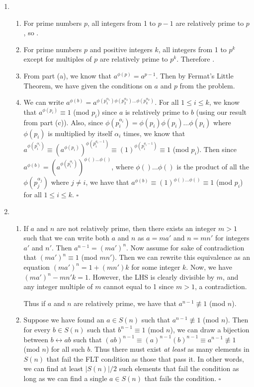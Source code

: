 \begin{enumerate}
    \item \begin{enumerate}
        \item For prime numbers $p$, all integers from 1 to $p-1$ are relatively prime to $p$, so .
        \item For prime numbers $p$ and positive integers $k$, all integers from 1 to $p^k$ except for multiples of $p$ are relatively prime to $p^k$. Therefore .
        \item From part (a), we know that $a^{\phi(p)}=a^{p-1}$. Then by Fermat's Little Theorem, we have  given the conditions on $a$ and $p$ from the problem.
        \item We can write $a^{\phi(b)} = a^{\phi(p_1^{\alpha_1})\phi(p_2^{\alpha_2})\ldots\phi(p_k^{\alpha_k})}$. For all $1\leq i\leq k$, we know that $a^{\phi(p_i)}\equiv 1$ (mod $p_i$) since $a$ is relatively prime to $b$ (using our result from part (c)). Also, since $\phi(p_i^{\alpha_i})=\phi(p_i)\phi(p_i)\ldots\phi(p_i)$ where $\phi(p_i)$ is multiplied by itself $\alpha_i$ times, we know that $a^{\phi(p_i^{\alpha_i})}\equiv (a^{\phi(p_i)})^{\phi(p_i^{a_i-1})} \equiv (1)^{\phi(p_i^{a_i-1})} \equiv 1$ (mod $p_i$). Then since $a^{\phi(b)} = (a^{\phi(p_i^{\alpha_i})})^{\phi()\ldots\phi()}$, where $\phi()\ldots\phi()$ is the product of all the $\phi(p_j^{\alpha_j})$ where $j\neq i$, we have that $a^{\phi(b)} \equiv (1)^{\phi()\ldots\phi()} \equiv 1$ (mod $p_i$) for all $1\leq i\leq k$. $\square$
    \end{enumerate}
    
    \item \begin{enumerate}
        \item If $a$ and $n$ are not relatively prime, then there exists an integer $m>1$ such that we can write both $a$ and $n$ as $a=ma'$ and $n=mn'$ for integers $a'$ and $n'$. Then $a^{n-1}=(ma')^n$. Now assume for sake of contradiction that $(ma')^n\equiv 1$ (mod $mn'$). Then we can rewrite this equivalence as an equation $(ma')^n = 1 + (mn')k$ for some integer $k$. Now, we have $(ma')^n-mn'k = 1$. However, the LHS is clearly divisible by $m$, and any integer multiple of $m$ cannot equal to 1 since $m>1$, a contradiction.
        
        Thus if $a$ and $n$ are relatively prime, we have that $a^{n-1}\not\equiv1$ (mod $n$).
        
        \item Suppose we have found an $a\in S(n)$ such that $a^{n-1}\not\equiv 1$ (mod $n$). Then for every $b\in S(n)$ such that $b^{n-1}\equiv 1$ (mod $n$), we can draw a bijection between $b\longleftrightarrow ab$ such that $(ab)^{n-1}\equiv (a)^{n-1}(b)^{n-1}\equiv a^{n-1}\not\equiv 1$ (mod $n$) for all such $b$. Thus there must exist \textit{at least} as many elements in $S(n)$ that fail the FLT condition as those that pass it. In other words, we can find at least $|S(n)|/2$ such elements that fail the condition as long as we can find a single $a\in S(n)$ that fails the condition. $\square$
        

\end{enumerate}
\end{enumerate}
